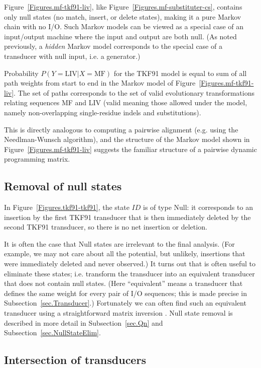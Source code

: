 \documentclass{article}
\newcommand{\secref}[1]{Subsection~\ref{sec.#1}}
\newcommand{\seclabel}[1]{\label{sec.#1}}
\newcommand{\figref}[1]{Figure~\ref{Figures.#1}}
\begin{document}
\figref{mf-tkf91-liv}, like \figref{mf-substituter-cs}, contains only null states (no match, insert, or delete states), making it a pure Markov chain with no I/O.  
Such Markov models can be viewed as a special case of an input/output machine where the input and output are both null.
(As noted previously, a {\em hidden} Markov model corresponds to  the special case of a transducer with null input, i.e. a generator.)

Probability $P(Y=\mbox{LIV}|X=\mbox{MF})$ for the TKF91 model
is equal to sum of all path weights from start to end in the Markov model of \figref{mf-tkf91-liv}. 
The set of paths corresponds to the set of valid evolutionary transformations relating
sequences MF and LIV (valid meaning those allowed under the model, namely non-overlapping single-residue indels and substitutions).  

This is directly analogous to computing a pairwise alignment (e.g. using the Needlman-Wunsch algorithm), and the structure of the Markov model shown in \figref{mf-tkf91-liv} suggests the familiar structure of a pairwise dynamic programming matrix.  

\subsection{Removal of null states}

In \figref{tkf91-tkf91}, the state $ID$ is of type Null:
it corresponds to an insertion by the first TKF91 transducer
that is then immediately deleted by the second TKF91 transducer,
so there is no net insertion or deletion.

It is often the case that Null states are irrelevant to the final analysis.
(For example, we may not care about all the potential, but unlikely,
insertions that were immediately deleted and never observed.)
It turns out that is often useful to eliminate these states;
i.e. transform the transducer into an equivalent transducer that does not contain null states.
(Here ``equivalent'' means a transducer that defines the same weight for every pair of I/O sequences;
this is made precise in \secref{Transducer}.)
Fortunately we can often find such an equivalent transducer
using a straightforward matrix inversion \cite{BradleyHolmes2009}.  
Null state removal is described in
more detail in \secref{Qn} and \secref{NullStateElim}.  


\subsection{Intersection of transducers}
\seclabel{Tutorial.Intersection}
\end{document}
